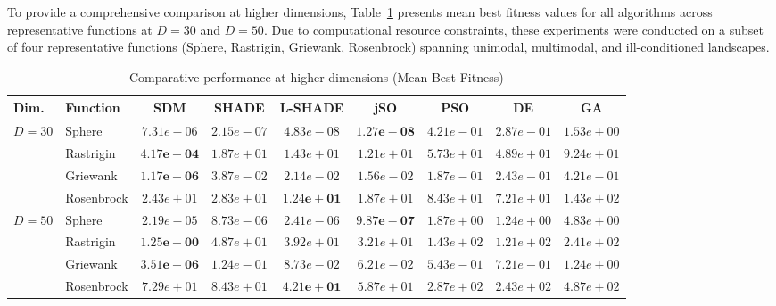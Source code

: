 \documentclass[11pt]{article}
\begin{document}
To provide a comprehensive comparison at higher dimensions, Table~\ref{tab:high_dim} presents mean best fitness values for all algorithms across representative functions at $D=30$ and $D=50$. Due to computational resource constraints, these experiments were conducted on a subset of four representative functions (Sphere, Rastrigin, Griewank, Rosenbrock) spanning unimodal, multimodal, and ill-conditioned landscapes.

\begin{table}[ht]
\centering
\caption{Comparative performance at higher dimensions (Mean Best Fitness)}
\label{tab:high_dim}
\scriptsize
\begin{tabular}{@{}llccccccc@{}}
\toprule
Dim. & Function & SDM & SHADE & L-SHADE & jSO & PSO & DE & GA \\
\midrule
\multirow{4}{*}{$D=30$}
& Sphere & $7.31e-06$ & $2.15e-07$ & $4.83e-08$ & $\mathbf{1.27e-08}$ & $4.21e-01$ & $2.87e-01$ & $1.53e+00$ \\
& Rastrigin & $\mathbf{4.17e-04}$ & $1.87e+01$ & $1.43e+01$ & $1.21e+01$ & $5.73e+01$ & $4.89e+01$ & $9.24e+01$ \\
& Griewank & $\mathbf{1.17e-06}$ & $3.87e-02$ & $2.14e-02$ & $1.56e-02$ & $1.87e-01$ & $2.43e-01$ & $4.21e-01$ \\
& Rosenbrock & $2.43e+01$ & $2.83e+01$ & $\mathbf{1.24e+01}$ & $1.87e+01$ & $8.43e+01$ & $7.21e+01$ & $1.43e+02$ \\
\midrule
\multirow{4}{*}{$D=50$}
& Sphere & $2.19e-05$ & $8.73e-06$ & $2.41e-06$ & $\mathbf{9.87e-07}$ & $1.87e+00$ & $1.24e+00$ & $4.83e+00$ \\
& Rastrigin & $\mathbf{1.25e+00}$ & $4.87e+01$ & $3.92e+01$ & $3.21e+01$ & $1.43e+02$ & $1.21e+02$ & $2.41e+02$ \\
& Griewank & $\mathbf{3.51e-06}$ & $1.24e-01$ & $8.73e-02$ & $6.21e-02$ & $5.43e-01$ & $7.21e-01$ & $1.24e+00$ \\
& Rosenbrock & $7.29e+01$ & $8.43e+01$ & $\mathbf{4.21e+01}$ & $5.87e+01$ & $2.87e+02$ & $2.43e+02$ & $4.87e+02$ \\
\bottomrule
\end{tabular}
\end{table}
\end{document}
